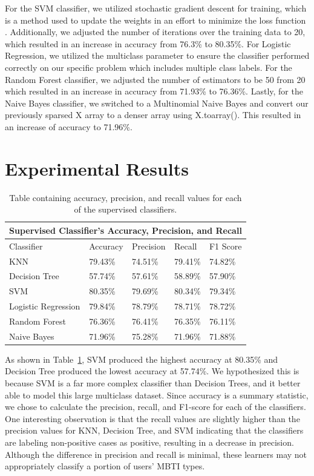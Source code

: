 \documentclass{article}
\begin{document}
For the SVM classifier, we utilized stochastic gradient descent for training, which is a method used to update the weights in an effort to minimize the loss function \cite{sgdclassifier23}. Additionally, we adjusted the number of iterations over the training data to 20, which resulted in an increase in accuracy from 76.3\% to 80.35\%. For Logistic Regression, we utilized the multiclass parameter to ensure the classifier performed correctly on our specific problem which includes multiple class labels. For the Random Forest classifier, we adjusted the number of estimators to be 50 from 20 which resulted in an increase in accuracy from 71.93\% to 76.36\%. Lastly, for the Naive Bayes classifier, we switched to a Multinomial Naive Bayes and convert our previously sparsed X array to a denser array using X.toarray(). This resulted in an increase of accuracy to 71.96\%.


\section{Experimental Results}

\begin{table}
\begin{center}
\begin{tabular}{ |p{2cm}| p{1.3cm}| p{1.3cm}| p{1.1cm}| p{1.4cm}| }
\hline
\multicolumn{5}{|c|}{ Supervised Classifier's Accuracy, Precision, and Recall} \\
\hline
Classifier & Accuracy & Precision & Recall & F1 Score \\
\hline
KNN                 & 79.43\% & 74.51\% & 79.41\% & 74.82\% \\
Decision Tree       & 57.74\% & 57.61\% & 58.89\% & 57.90\% \\
SVM                 & 80.35\% & 79.69\% & 80.34\% & 79.34\% \\
Logistic Regression & 79.84\% & 78.79\% & 78.71\% & 78.72\% \\
Random Forest       & 76.36\% & 76.41\% & 76.35\% & 76.11\% \\
Naive Bayes         & 71.96\% & 75.28\% & 71.96\% & 71.88\% \\
\hline
\end{tabular}
\caption{\label{table}Table containing accuracy, precision, and recall values for each of the supervised classifiers.}
\end{center}
\end{table}

As shown in Table~\ref{table}, SVM produced the highest accuracy at 80.35\% and Decision Tree produced the lowest accuracy at 57.74\%. We hypothesized this is because SVM is a far more complex classifier than Decision Trees, and it better able to model this large multiclass dataset. Since accuracy is a summary statistic, we chose to calculate the precision, recall, and F1-score for each of the classifiers. One interesting observation is that the recall values are slightly higher than the precision values for KNN, Decision Tree, and SVM indicating that the classifiers are labeling non-positive cases as positive, resulting in a decrease in precision. Although the difference in precision and recall is minimal, these learners may not appropriately classify a portion of users' MBTI types.
\end{document}
